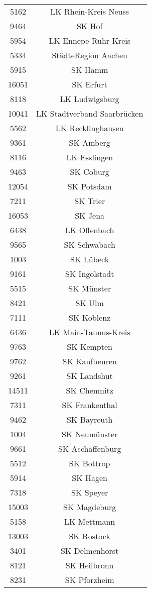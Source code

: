 \begin{tabular}{c c}
    5162&LK Rhein-Kreis Neuss\\ 
    9464&SK Hof\\ 
    5954&LK Ennepe-Ruhr-Kreis\\ 
    5334&StädteRegion Aachen\\ 
    5915&SK Hamm\\ 
    16051&SK Erfurt\\ 
    8118&LK Ludwigsburg\\ 
    10041&LK Stadtverband Saarbrücken\\ 
    5562&LK Recklinghausen\\ 
    9361&SK Amberg\\ 
    8116&LK Esslingen\\ 
    9463&SK Coburg\\ 
    12054&SK Potsdam\\ 
    7211&SK Trier\\ 
    16053&SK Jena\\ 
    6438&LK Offenbach\\ 
    9565&SK Schwabach\\ 
    1003&SK Lübeck\\ 
    9161&SK Ingolstadt\\ 
    5515&SK Münster\\ 
    8421&SK Ulm\\ 
    7111&SK Koblenz\\ 
    6436&LK Main-Taunus-Kreis\\ 
    9763&SK Kempten\\ 
    9762&SK Kaufbeuren\\ 
    9261&SK Landshut\\ 
    14511&SK Chemnitz\\ 
    7311&SK Frankenthal\\ 
    9462&SK Bayreuth\\ 
    1004&SK Neumünster\\ 
    9661&SK Aschaffenburg\\ 
    5512&SK Bottrop\\ 
    5914&SK Hagen\\ 
    7318&SK Speyer\\ 
    15003&SK Magdeburg\\ 
    5158&LK Mettmann\\ 
    13003&SK Rostock\\ 
    3401&SK Delmenhorst\\ 
    8121&SK Heilbronn\\ 
    8231&SK Pforzheim\\ 

\end{tabular}

